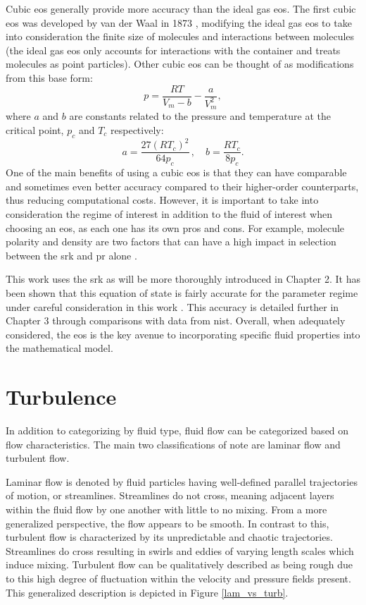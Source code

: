 Cubic \gls{eos} generally provide more accuracy than the ideal gas \gls{eos}. The first cubic \gls{eos} was developed by van der Waal in 1873 \cite{}, modifying the ideal gas \gls{eos} to take into consideration the finite size of molecules and interactions between molecules (the ideal gas \gls{eos} only accounts for interactions with the container and treats molecules as point particles). Other cubic \gls{eos} can be thought of as modifications from this base form: 
\begin{equation} \label{vanderwaal}
p = \dfrac{RT}{V_m - b} - \dfrac{a}{V_m^2},
\end{equation}
where $a$ and $b$ are constants related to the pressure and temperature at the critical point, $p_c$ and $T_c$ respectively: 
$$a = \dfrac{27(RT_c)^2}{64p_c}\,, \quad b = \dfrac{RT_c}{8p_c}.$$
One of the main benefits of using a cubic \gls{eos} is that they can have comparable and sometimes even better accuracy compared to their higher-order counterparts, thus reducing computational costs. However, it is important to take into consideration the regime of interest in addition to the fluid of interest when choosing an \gls{eos}, as each one has its own pros and cons. For example, molecule polarity and density are two factors that can have a high impact in selection between the \gls{srk} and \gls{pr} alone \cite{GHANBARI201713}. 

This work uses the \gls{srk} as will be more thoroughly introduced in Chapter 2. It has been shown that this equation of state is fairly accurate for the parameter regime under careful consideration in this work \cite{}. This accuracy is detailed further in Chapter 3 through comparisons with data from \gls{nist}. Overall, when adequately considered, the \gls{eos} is the key avenue to incorporating specific fluid properties into the mathematical model.


\section{Turbulence}
In addition to categorizing by fluid type, fluid flow can be categorized based on flow characteristics. The main two classifications of note are laminar flow and turbulent flow.

Laminar flow is denoted by fluid particles having well-defined parallel trajectories of motion, or streamlines. Streamlines do not cross, meaning adjacent layers within the fluid flow by one another with little to no mixing. From a more generalized perspective, the flow appears to be smooth. In contrast to this, turbulent flow is characterized by its unpredictable and chaotic trajectories. Streamlines do cross resulting in swirls and eddies of varying length scales which induce mixing. Turbulent flow can be qualitatively described as being rough due to this high degree of fluctuation within the velocity and pressure fields present. This generalized description is depicted in Figure \ref{lam_vs_turb}.

